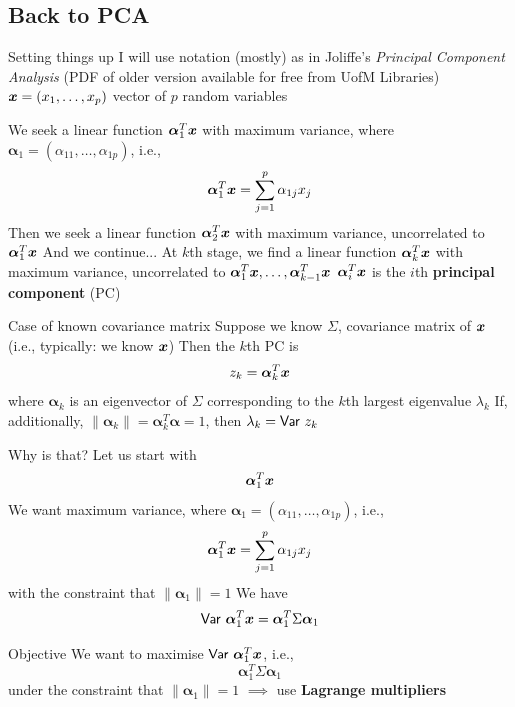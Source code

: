 \documentclass[aspectratio=169]{beamer}\usepackage[]{graphicx}\usepackage[]{xcolor}
\begin{document}
\subsection{Back to PCA}
\begin{frame}{Setting things up}
I will use notation (mostly) as in Joliffe's \emph{Principal Component Analysis} (PDF of older version available for free from UofM Libraries)
\vfill
$\bm{x}=(x_1,\ldots,x_p)$ vector of $p$ random variables
\end{frame}


\begin{frame} 
We seek a linear function $\bm{\alpha}_1^T\bm{x}$ with maximum variance, where $\bm{\alpha}_1=(\alpha_{11},\ldots,\alpha_{1p})$, i.e.,
\[
\bm{\alpha}_1^T\bm{x} = \sum_{j=1}^p\alpha_{1j}x_j
\]
\vfill
Then we seek a linear function $\bm{\alpha}_2^T\bm{x}$ with maximum variance, uncorrelated to $\bm{\alpha}_1^T\bm{x}$
\vfill
And we continue...
\vfill
At $k$th stage, we find a linear function $\bm{\alpha}_k^T\bm{x}$ with maximum variance, uncorrelated to $\bm{\alpha}_1^T\bm{x},\ldots,\bm{\alpha}_{k-1}^T\bm{x}$
\vfill
$\bm{\alpha}_i^T\bm{x}$ is the $i$th \textbf{principal component} (PC)
\end{frame}

\begin{frame}{Case of known covariance matrix}
Suppose we know $\Sigma$, covariance matrix of $\bm{x}$ (i.e., typically: we know $\bm{x}$)
\vfill
Then the $k$th PC is 
\[
z_k=\bm{\alpha}_k^T\bm{x}
\]
where $\bm{\alpha}_k$ is an eigenvector of $\Sigma$ corresponding to the $k$th largest eigenvalue $\lambda_k$
\vfill
If, additionally, $\|\bm{\alpha}_k\|=\bm{\alpha}_k^T\bm{\alpha}=1$, then $\lambda_k=\mathsf{Var}\  z_k$
\end{frame}


\begin{frame}{Why is that?}
Let us start with
\[
\bm{\alpha}_1^T\bm{x}
\]
\vfill
We want maximum variance, where $\bm{\alpha}_1=(\alpha_{11},\ldots,\alpha_{1p})$, i.e.,
\[
\bm{\alpha}_1^T\bm{x} = \sum_{j=1}^p\alpha_{1j}x_j
\]
with the constraint that $\|\bm{\alpha}_1\|=1$
\vfill
We have
\[
\mathsf{Var}\  \bm{\alpha}_1^T\bm{x}
=\bm{\alpha}_1^T\Sigma\bm{\alpha}_1
\]
\end{frame}

\begin{frame}{Objective}
We want to maximise $\mathsf{Var}\  \bm{\alpha}_1^T\bm{x}$, i.e.,
\[
\bm{\alpha}_1^T\Sigma\bm{\alpha}_1
\]
under the constraint that $\|\bm{\alpha}_1\|=1$
\vfill
$\implies$ use \textbf{Lagrange multipliers}
\end{frame}
\end{document}
